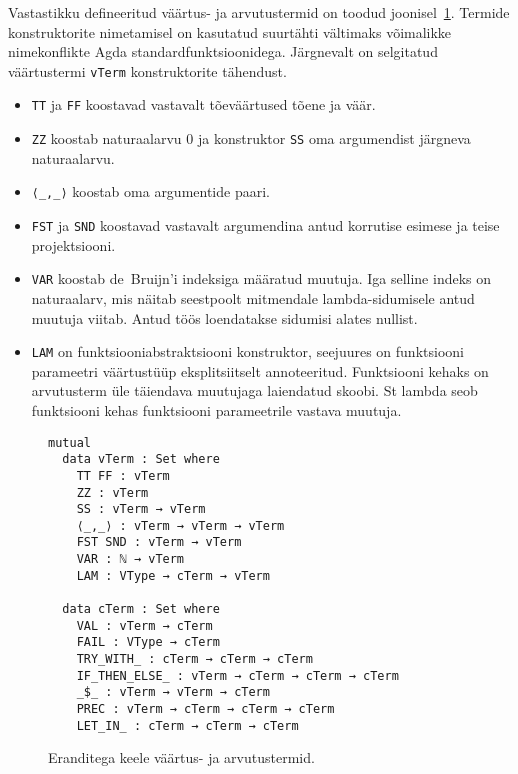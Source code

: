 \documentclass[a4paper,12pt]{article}
\begin{document}
Vastastikku defineeritud väärtus- ja arvutustermid on toodud joonisel~\ref{fig:exc.raw}.
Termide konstruktorite nimetamisel on kasutatud suurtähti vältimaks võimalikke nimekonflikte Agda standardfunktsioonidega.
Järgnevalt on selgitatud väärtustermi {\tt vTerm} konstruktorite tähendust.
\begin{itemize}
\item {\tt TT} ja {\tt FF} koostavad vastavalt tõeväärtused tõene ja väär.
\item {\tt ZZ} koostab naturaalarvu 0 ja konstruktor {\tt SS} oma argumendist järgneva naturaalarvu.
\item {\tt ⟨_,_⟩} koostab oma argumentide paari.
\item {\tt FST} ja {\tt SND} koostavad vastavalt argumendina antud korrutise esimese ja teise projektsiooni.
\item {\tt VAR} koostab de~Bruijn'i indeksiga määratud muutuja. Iga selline indeks on naturaalarv, mis näitab seestpoolt mitmendale lambda-sidumisele antud muutuja viitab. Antud töös loendatakse sidumisi alates nullist.
\item {\tt LAM} on funktsiooniabstraktsiooni konstruktor, seejuures on funktsiooni parameetri väärtustüüp eksplitsiitselt annoteeritud. Funktsiooni kehaks on arvutusterm üle täiendava muutujaga laiendatud skoobi. St lambda seob funktsiooni kehas funktsiooni parameetrile vastava muutuja.
\end{itemize}
\begin{figure}
  \begin{BVerbatim}
mutual
  data vTerm : Set where
    TT FF : vTerm
    ZZ : vTerm
    SS : vTerm → vTerm
    ⟨_,_⟩ : vTerm → vTerm → vTerm
    FST SND : vTerm → vTerm
    VAR : ℕ → vTerm
    LAM : VType → cTerm → vTerm

  data cTerm : Set where
    VAL : vTerm → cTerm
    FAIL : VType → cTerm
    TRY_WITH_ : cTerm → cTerm → cTerm
    IF_THEN_ELSE_ : vTerm → cTerm → cTerm → cTerm
    _$_ : vTerm → vTerm → cTerm
    PREC : vTerm → cTerm → cTerm → cTerm
    LET_IN_ : cTerm → cTerm → cTerm
  \end{BVerbatim}
  \caption{Eranditega keele väärtus- ja arvutustermid.}
  \label{fig:exc.raw}
\end{figure}
\end{document}
